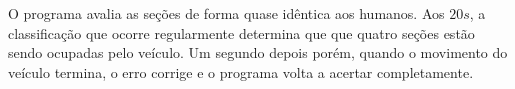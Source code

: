 O programa avalia as seções de forma quase idêntica aos humanos. Aos $20s$, a classificação que ocorre regularmente determina que que quatro seções estão sendo ocupadas pelo veículo. Um segundo depois porém, quando o movimento do veículo termina, o erro corrige e o programa volta a acertar completamente.











